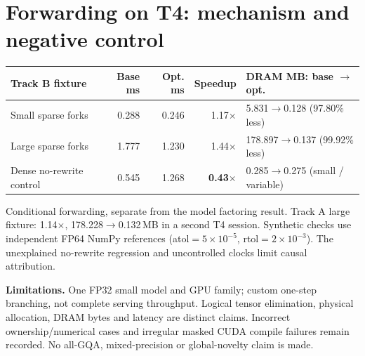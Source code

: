 \documentclass[10pt,a4paper]{article}
\newcommand{\smallnote}[1]{{\footnotesize #1\par}}
\begin{document}
\section{Forwarding on T4: mechanism and negative control}
{\small
\begin{tabularx}{\linewidth}{@{}Y r r r P{36mm}@{}}
\toprule
\textbf{Track B fixture} & \textbf{Base ms} & \textbf{Opt. ms} & \textbf{Speedup} & \textbf{DRAM MB: base $\to$ opt.}\\
\midrule
Small sparse forks&0.288&0.246&1.17$\times$&5.831$\to$0.128 (97.80\% less)\\
Large sparse forks&1.777&1.230&1.44$\times$&178.897$\to$0.137 (99.92\% less)\\
Dense no-rewrite control&0.545&1.268&\textbf{0.43$\times$}&0.285$\to$0.275 (small / variable)\\
\bottomrule
\end{tabularx}}
\smallnote{Conditional forwarding, separate from the model factoring result. Track A large fixture: 1.14$\times$, 178.228$\to$0.132\,MB in a second T4 session. Synthetic checks use independent FP64 NumPy references (atol$=5\!\times\!10^{-5}$, rtol$=2\!\times\!10^{-3}$). The unexplained no-rewrite regression and uncontrolled clocks limit causal attribution.}

\textbf{Limitations.} One FP32 small model and GPU family; custom one-step branching, not complete serving throughput. Logical tensor elimination, physical allocation, DRAM bytes and latency are distinct claims. Incorrect ownership/numerical cases and irregular masked CUDA compile failures remain recorded. No all-GQA, mixed-precision or global-novelty claim is made.
\end{document}
